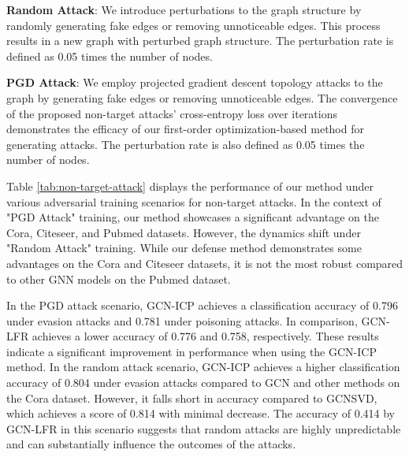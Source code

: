 \documentclass[conference]{IEEEtran}
\begin{document}
\textbf{Random Attack}: We introduce perturbations to the graph structure by randomly generating fake edges or removing unnoticeable edges. This process results in a new graph with perturbed graph structure. The perturbation rate is defined as 0.05 times the number of nodes.

\textbf{PGD Attack}: We employ projected gradient descent topology attacks to the graph by generating fake edges or removing unnoticeable edges. The convergence of the proposed non-target attacks’ cross-entropy loss over iterations demonstrates the efficacy of our first-order optimization-based method for generating attacks. The perturbation rate is also defined as 0.05 times the number of nodes.

Table \ref{tab:non-target-attack}  displays the performance of our method under various adversarial training scenarios for non-target attacks. In the context of "PGD Attack" training, our method showcases a significant advantage on the Cora, Citeseer, and Pubmed datasets. However, the dynamics shift under "Random Attack" training. While our defense method demonstrates some advantages on the Cora and Citeseer datasets, it is not the most robust compared to other GNN models on the Pubmed dataset.

In the PGD attack scenario, GCN-ICP achieves a classification accuracy of 0.796 under evasion attacks and 0.781 under poisoning attacks. In comparison, GCN-LFR achieves a lower accuracy of 0.776 and 0.758, respectively. These results indicate a significant improvement in performance when using the GCN-ICP method. In the random attack scenario, GCN-ICP achieves a higher classification accuracy of 0.804 under evasion attacks compared to GCN and other methods on the Cora dataset. However, it falls short in accuracy compared to GCNSVD, which achieves a score of 0.814 with minimal decrease. The accuracy of 0.414 by GCN-LFR in this scenario suggests that random attacks are highly unpredictable and can substantially influence the outcomes of the attacks.
\end{document}
